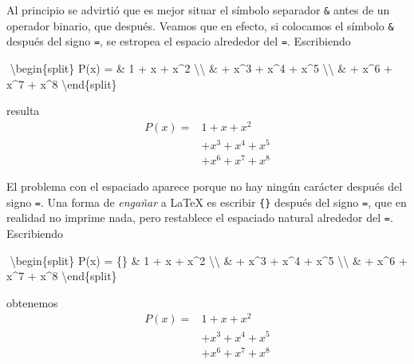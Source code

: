 \documentclass[
  letterpaper,
  DIV=11,
  numbers=noendperiod]{scrartcl}
\newenvironment{Shaded}{\begin{snugshade}}{\end{snugshade}}
\newcommand{\ExtensionTok}[1]{\textcolor[rgb]{0.00,0.23,0.31}{#1}}
\newcommand{\KeywordTok}[1]{\textcolor[rgb]{0.00,0.23,0.31}{#1}}
\newcommand{\NormalTok}[1]{\textcolor[rgb]{0.00,0.23,0.31}{#1}}
\newcommand{\SpecialCharTok}[1]{\textcolor[rgb]{0.37,0.37,0.37}{#1}}
\newcommand{\SpecialStringTok}[1]{\textcolor[rgb]{0.13,0.47,0.30}{#1}}
\begin{document}
Al principio se advirtió que es mejor situar el símbolo separador
\texttt{\&} antes de un operador binario, que después. Veamos que en
efecto, si colocamos el símbolo \texttt{\&} después del signo
\texttt{=}, se estropea el espacio alrededor del \texttt{=}. Escribiendo

\begin{Shaded}
\begin{Highlighting}[]
\SpecialStringTok{$$}
\KeywordTok{\textbackslash{}begin}\NormalTok{\{}\ExtensionTok{split}\NormalTok{\}}
\SpecialStringTok{P(x) = \& 1  + x + x\^{}2 }\SpecialCharTok{\textbackslash{}\textbackslash{}}
\SpecialStringTok{       \& + x\^{}3 + x\^{}4 + x\^{}5 }\SpecialCharTok{\textbackslash{}\textbackslash{}}
\SpecialStringTok{       \& + x\^{}6 + x\^{}7 + x\^{}8}
\KeywordTok{\textbackslash{}end}\NormalTok{\{}\ExtensionTok{split}\NormalTok{\}}
\SpecialStringTok{$$}
\end{Highlighting}
\end{Shaded}

resulta \[
\begin{split}
P(x) = & 1  + x + x^2 \\
     & + x^3 + x^4 + x^5 \\
     & + x^6 + x^7 + x^8
\end{split}
\]

El problema con el espaciado aparece porque no hay ningún carácter
después del signo \texttt{=}. Una forma de \emph{engañar} a LaTeX es
escribir \texttt{\{\}} después del signo \texttt{=}, que en realidad no
imprime nada, pero restablece el espaciado natural alrededor del
\texttt{=}. Escribiendo

\begin{Shaded}
\begin{Highlighting}[]
\SpecialStringTok{$$}
\KeywordTok{\textbackslash{}begin}\NormalTok{\{}\ExtensionTok{split}\NormalTok{\}}
\SpecialStringTok{P(x) = \{\} \& 1  + x + x\^{}2 }\SpecialCharTok{\textbackslash{}\textbackslash{}}
\SpecialStringTok{          \& + x\^{}3 + x\^{}4 + x\^{}5 }\SpecialCharTok{\textbackslash{}\textbackslash{}}
\SpecialStringTok{          \& + x\^{}6 + x\^{}7 + x\^{}8}
\KeywordTok{\textbackslash{}end}\NormalTok{\{}\ExtensionTok{split}\NormalTok{\}}
\SpecialStringTok{$$}
\end{Highlighting}
\end{Shaded}

obtenemos \[
\begin{split}
P(x) = {} & 1  + x + x^2 \\
     & + x^3 + x^4 + x^5 \\
     & + x^6 + x^7 + x^8
\end{split}
\]
\end{document}
